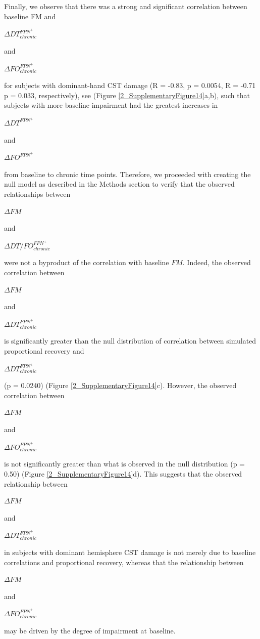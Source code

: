 \documentclass[phd,tocprelim]{cornell}
\begin{document}
    Finally, we observe that there was a strong and significant correlation between baseline FM and \begin{Large}$\Delta DT^{FPN^+}_{chronic}$\end{Large} and \begin{Large}$\Delta FO^{FPN^+}_{chronic}$\end{Large} for subjects with dominant-hand CST damage (R = -0.83, p = 0.0054, R = -0.71 p = 0.033, respectively), see (Figure \ref{2_SupplementaryFigure14}a,b), such that subjects with more baseline impairment had the greatest increases in \begin{Large}$\Delta DT^{FPN^+}$\end{Large} and \begin{Large}$\Delta FO^{FPN^+}$\end{Large} from baseline to chronic time points. Therefore, we proceeded with creating the null model as described in the Methods section to verify that the observed relationships between \begin{Large}$\Delta FM$\end{Large} and \begin{Large}$\Delta DT/FO^{FPN^+}_{chronic}$\end{Large} were not a byproduct of the correlation with baseline $FM$. Indeed, the observed correlation between \begin{Large}$\Delta FM$\end{Large} and \begin{Large}$\Delta DT^{FPN^+}_{chronic}$\end{Large} is significantly greater than the null distribution of correlation between simulated proportional recovery and \begin{Large}$\Delta DT^{FPN^+}_{chronic}$\end{Large} (p = 0.0240) (Figure \ref{2_SupplementaryFigure14}c). However, the observed correlation between \begin{Large}$\Delta FM$\end{Large} and \begin{Large}$\Delta FO^{FPN^+}_{chronic}$\end{Large} is not significantly greater than what is observed in the null distribution (p = 0.50) (Figure \ref{2_SupplementaryFigure14}d). This suggests that the observed relationship between \begin{Large}$\Delta FM$\end{Large} and \begin{Large}$\Delta DT^{FPN^+}_{chronic}$\end{Large} in subjects with dominant hemisphere CST damage is not merely due to baseline correlations and proportional recovery, whereas that the relationship between \begin{Large}$\Delta FM$\end{Large} and \begin{Large}$\Delta FO^{FPN^+}_{chronic}$\end{Large} may be driven by the degree of impairment at baseline. 
\end{document}
